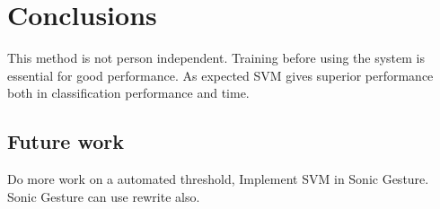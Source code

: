 
\chapter{Conclusions}
\label{ch:conc}


This method is not person independent. Training before using the system is essential for good performance. As expected SVM gives superior performance both in classification performance and time.


\section{Future work}
Do more work on a automated threshold, Implement SVM in Sonic Gesture. Sonic Gesture can use rewrite also.
